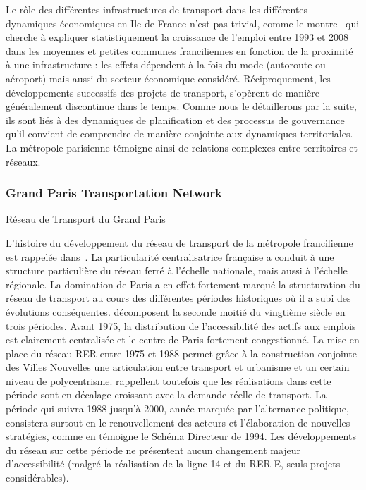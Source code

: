 Le rôle des différentes infrastructures de transport dans les différentes dynamiques économiques en Ile-de-France n'est pas trivial, comme le montre~\cite{PADEIRO201344} qui cherche à expliquer statistiquement la croissance de l'emploi entre 1993 et 2008 dans les moyennes et petites communes franciliennes en fonction de la proximité à une infrastructure : les effets dépendent à la fois du mode (autoroute ou aéroport) mais aussi du secteur économique considéré. Réciproquement, les développements successifs des projets de transport, s'opèrent de manière généralement discontinue dans le temps. Comme nous le détaillerons par la suite, ils sont liés à des dynamiques de planification et des processus de gouvernance qu'il convient de comprendre de manière conjointe aux dynamiques territoriales. La métropole parisienne témoigne ainsi de relations complexes entre territoires et réseaux.




\subsubsection{Grand Paris Transportation Network}{Réseau de Transport du Grand Paris}

L'histoire du développement du réseau de transport de la métropole francilienne est rappelée dans~\cite{beauguitte:halshs-01068589}. La particularité centralisatrice française a conduit à une structure particulière du réseau ferré à l'échelle nationale, mais aussi à l'échelle régionale. La domination de Paris a en effet fortement marqué la structuration du réseau de transport au cours des différentes périodes historiques où il a subi des évolutions conséquentes. \cite{larroque2002paris} décomposent la seconde moitié du vingtième siècle en trois périodes. Avant 1975, la distribution de l'accessibilité des actifs aux emplois est clairement centralisée et le centre de Paris fortement congestionné. La mise en place du réseau RER entre 1975 et 1988 permet grâce à la construction conjointe des Villes Nouvelles une articulation entre transport et urbanisme et un certain niveau de polycentrisme. \cite{larroque2002paris} rappellent toutefois que les réalisations dans cette période sont en décalage croissant avec la demande réelle de transport. La période qui suivra 1988 jusqu'à 2000, année marquée par l'alternance politique, consistera  surtout en le renouvellement des acteurs et l'élaboration de nouvelles stratégies, comme en témoigne le Schéma Directeur de 1994. Les développements du réseau sur cette période ne présentent aucun changement majeur d'accessibilité (malgré la réalisation de la ligne 14 et du RER E, seuls projets considérables).


